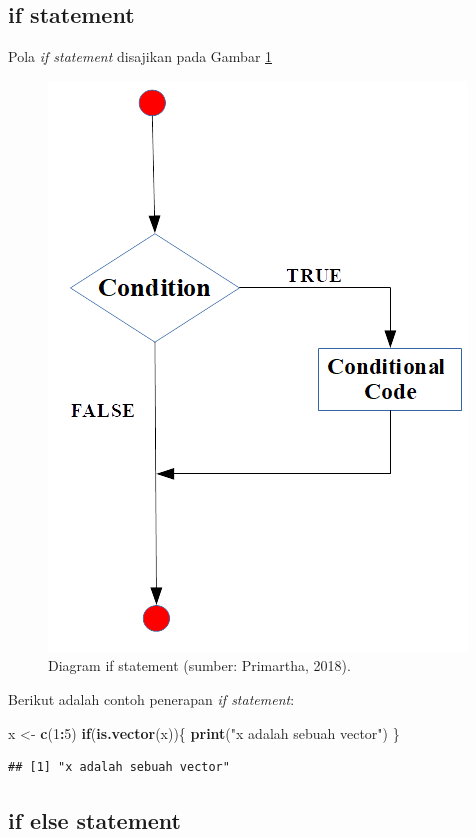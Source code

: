 \documentclass[]{book}
\newenvironment{Shaded}{\begin{snugshade}}{\end{snugshade}}
\newcommand{\ControlFlowTok}[1]{\textcolor[rgb]{0.13,0.29,0.53}{\textbf{#1}}}
\newcommand{\DecValTok}[1]{\textcolor[rgb]{0.00,0.00,0.81}{#1}}
\newcommand{\KeywordTok}[1]{\textcolor[rgb]{0.13,0.29,0.53}{\textbf{#1}}}
\newcommand{\NormalTok}[1]{#1}
\newcommand{\OperatorTok}[1]{\textcolor[rgb]{0.81,0.36,0.00}{\textbf{#1}}}
\newcommand{\StringTok}[1]{\textcolor[rgb]{0.31,0.60,0.02}{#1}}
\theoremstyle{definition}
\theoremstyle{definition}
\theoremstyle{definition}
\theoremstyle{remark}
\begin{document}
\hypertarget{ifstatement}{%
\subsection{if statement}\label{ifstatement}}

Pola \emph{if statement} disajikan pada Gambar \ref{fig:ifstatement}

\begin{figure}

{\centering \includegraphics[width=0.4\linewidth]{./images/ifstatement} 

}

\caption{Diagram if statement (sumber: Primartha, 2018).}\label{fig:ifstatement}
\end{figure}

Berikut adalah contoh penerapan \emph{if statement}:

\begin{Shaded}
\begin{Highlighting}[]
\NormalTok{x <-}\StringTok{ }\KeywordTok{c}\NormalTok{(}\DecValTok{1}\OperatorTok{:}\DecValTok{5}\NormalTok{)}
\ControlFlowTok{if}\NormalTok{(}\KeywordTok{is.vector}\NormalTok{(x))\{}
  \KeywordTok{print}\NormalTok{(}\StringTok{"x adalah sebuah vector"}\NormalTok{)}
\NormalTok{\}}
\end{Highlighting}
\end{Shaded}

\begin{verbatim}
## [1] "x adalah sebuah vector"
\end{verbatim}

\hypertarget{ifelsestatement}{%
\subsection{if else statement}\label{ifelsestatement}}
\end{document}
